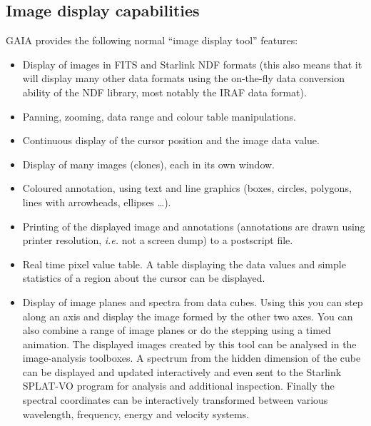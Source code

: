 \documentclass[twoside,11pt]{article}
\newcommand{\xref}[3]{#1}
\newcommand{\xlabel}[1]{}
\renewcommand{\_}{\texttt{\symbol{95}}}
\begin{document}
\subsection{\xlabel{image_display_capabilities}Image display capabilities}
GAIA provides the following normal ``image display tool'' features:
\begin{itemize}
\item Display of images in FITS and Starlink \xref{NDF}{sun33}{}
  formats (this also means that it will display many other data formats
  using the on-the-fly data conversion ability of the NDF library, most
  notably the IRAF data format).

\item Panning, zooming, data range and colour table manipulations.

\item Continuous display of the cursor position and the image data
  value.

\item Display of many images (clones), each in its own window.

\item Coloured annotation, using text and line graphics (boxes,
  circles, polygons, lines with arrowheads, ellipses \ldots).

\item Printing of the displayed image and annotations (annotations
  are drawn using printer resolution, \textit{i.e.} not a screen dump)
  to a postscript file.

\item Real time pixel value table. A table displaying the data
  values and simple statistics of a region about the cursor can be
  displayed.

\item Display of image planes and spectra from data cubes. Using this you can
  step along an axis and display the image formed by the other two axes.  You
  can also combine a range of image planes or do the stepping using a timed
  animation. The displayed images created by this tool can be analysed in the
  image-analysis toolboxes. A spectrum from the hidden dimension of the cube
  can be displayed and updated interactively and even sent to the Starlink
  SPLAT-VO program for analysis and additional inspection. Finally the
  spectral coordinates can be interactively transformed between various
  wavelength, frequency, energy and velocity systems.
\end{itemize}
\end{document}
